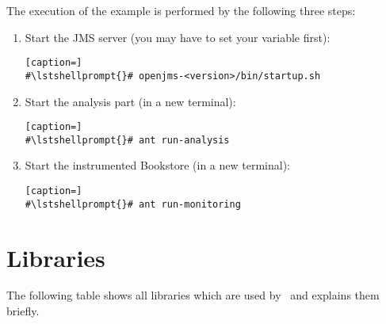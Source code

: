 \enlargethispage{2cm}

 The execution of the example is performed by the following three steps:
\begin{enumerate}
\item Start the JMS server (you may have to set your  variable first):

\setBashListing
\begin{lstlisting}[caption=]
#\lstshellprompt{}# openjms-<version>/bin/startup.sh
\end{lstlisting}
\item Start the analysis part (in a new terminal):
\setBashListing
\begin{lstlisting}[caption=]
#\lstshellprompt{}# ant run-analysis
\end{lstlisting}
\item Start the instrumented Bookstore (in a new terminal):
\setBashListing
\begin{lstlisting}[caption=]
#\lstshellprompt{}# ant run-monitoring
\end{lstlisting}
\end{enumerate}

\chapter{Libraries}
    The following table shows all libraries which are used by \Kieker\ and explains them briefly.
    

